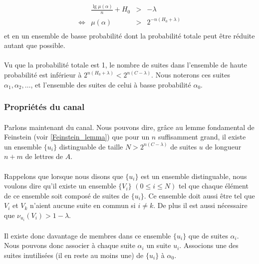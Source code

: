 	\[
		\begin{array}{crcl}
			&\frac{\lg \mu\left(\alpha\right)}{n}+H_0 &>& -\lambda\\
			\Leftrightarrow & \mu(\alpha) & > &2^{-n\left(H_0+\lambda\right)}\\
		\end{array}
	\]
	et en un ensemble de basse probabilité dont la probabilité totale peut être 
	réduite autant que possible.

	\paragraph{}
	Vu que la probabilité totale est 1, le nombre de suites dans l'ensemble
	de haute probabilité est inférieur à $2^{n(H_0+\lambda)}<2^{n(C-\lambda)}$.
	Nous noterons ces suites $\alpha_1,\alpha_2,\dots$, et l'ensemble des
	suites de celui à basse probabilité $\alpha_0$.
	
\subsubsection*{Propriétés du canal}
	
	\paragraph{}
	Parlons maintenant du canal. Nous pouvons dire, grâce au lemme fondamental
	de Feinstein (voir \ref{Feinstein_lemma}) que pour un $n$ suffisamment
	grand, il existe un ensemble $\{u_i\}$ distinguable de taille 
	$N > 2^{n(C-\lambda)}$ de suites $u$ de longueur $n+m$ de lettres 
	de $A$.
	
	\paragraph{}
	Rappelons que lorsque nous disons que $\{u_i\}$ est un ensemble distinguable,
	nous voulons dire qu'il existe un ensemble $\{V_i\}$ $(0 \le i \le N)$ 
	tel que chaque élément de ce ensemble soit composé de suites de $\{u_i\}$.
	Ce ensemble doit aussi être tel que $ V_i$ et $V_k$ n'aient aucune suite
	en commun si $i\neq k$. De plus il est aussi nécessaire que
	$\nu_{u_i}(V_i) > 1-\lambda$. 
	
	\paragraph{}
	Il existe donc davantage de membres dans ce ensemble $\{u_i\}$ que de 
	suites $\alpha_i$. Nous pouvons donc associer à chaque suite 
	$\alpha_i$ un suite $u_i$. Associons une des suites inutilisées 
	(il en reste au moins une) de $\{u_i\}$ à $\alpha_0$.
	
